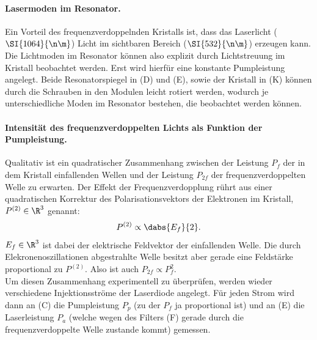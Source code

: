 \documentclass[../main.tex]{subfiles}
\begin{document}
        
        \paragraph{Lasermoden im Resonator.}
            Ein Vorteil des frequenzverdoppelnden Kristalls ist, dass das Laserlicht ($\SI{1064}{\n\m}$) Licht im sichtbaren Bereich ($\SI{532}{\n\m}$) erzeugen kann. Die Lichtmoden im Resonator können also explizit durch Lichtstreuung im Kristall beobachtet werden. Erst wird hierfür eine konstante Pumpleistung angelegt. Beide Resonatorspiegel in (D) und (E), sowie der Kristall in (K) können durch die Schrauben in den Modulen leicht rotiert werden, wodurch je unterschiedliche Moden im Resonator bestehen, die beobachtet werden können.

        \paragraph{Intensität des frequenzverdoppelten Lichts als Funktion der Pumpleistung.}
            Qualitativ ist ein quadratischer Zusammenhang zwischen der Leistung $P_f$ der in dem Kristall einfallenden Wellen und der Leistung $P_{2f}$ der frequenzverdoppelten Welle zu erwarten. Der Effekt der Frequenzverdopplung rührt aus einer quadratischen Korrektur des Polarisationsvektors der Elektronen im Kristall, $P^{(2)}\in\R^3$ genannt:
            \[
                P^{(2)} \propto \dabs{E_f}{2}.
            \]
            $E_f\in\R^3$ ist dabei der elektrische Feldvektor der einfallenden Welle. Die durch Elekronenoszillationen abgestrahlte Welle besitzt aber gerade eine Feldstärke proportional zu $P^{(2)}$. Also ist auch $P_{2f}\propto P_{f}^2$.\\

            Um diesen Zusammenhang experimentell zu überprüfen, werden wieder verschiedene Injektionsströme der Laserdiode angelegt. Für jeden Strom wird dann an (C) die Pumpleistung $P_p$ (zu der $P_f$ ja proportional ist) und an (E) die Laserleistung $P_a$ (welche wegen des Filters (F) gerade durch die frequenzverdoppelte Welle zustande kommt) gemessen.
            
\end{document}

